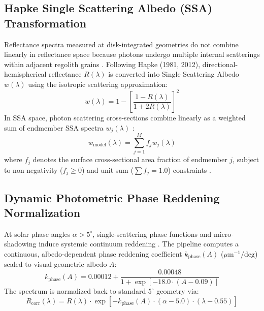 \documentclass[11pt,a4paper]{article}
\begin{document}
\subsection{Hapke Single Scattering Albedo (SSA) Transformation}
Reflectance spectra measured at disk-integrated geometries do not combine linearly in reflectance space because photons undergo multiple internal scatterings within adjacent regolith grains \cite{Hapke1981}. Following Hapke (1981, 2012), directional-hemispherical reflectance $R(\lambda)$ is converted into Single Scattering Albedo $w(\lambda)$ using the isotropic scattering approximation:
\begin{equation}
w(\lambda) = 1 - \left[ \frac{1 - R(\lambda)}{1 + 2R(\lambda)} \right]^2
\label{eq:hapke_ssa}
\end{equation}
In SSA space, photon scattering cross-sections combine linearly as a weighted sum of endmember SSA spectra $w_j(\lambda)$ \cite{Hapke1981, Hapke2012}:
\begin{equation}
w_{\text{model}}(\lambda) = \sum_{j=1}^{M} f_j w_j(\lambda)
\label{eq:ssa_linear}
\end{equation}
where $f_j$ denotes the surface cross-sectional area fraction of endmember $j$, subject to non-negativity ($f_j \ge 0$) and unit sum ($\sum f_j = 1.0$) constraints \cite{Lawson1995}.

\subsection{Dynamic Photometric Phase Reddening Normalization}
At solar phase angles $\alpha > 5^\circ$, single-scattering phase functions and micro-shadowing induce systemic continuum reddening \cite{Sanchez2012, Fornasier2015}. The pipeline computes a continuous, albedo-dependent phase reddening coefficient $k_{\text{phase}}(A)$ ($\mu\text{m}^{-1}/\text{deg}$) scaled to visual geometric albedo $A$:
\begin{equation}
k_{\text{phase}}(A) = 0.00012 + \frac{0.00048}{1 + \exp\left[-18.0 \cdot (A - 0.09)\right]}
\label{eq:phase_reddening}
\end{equation}
The spectrum is normalized back to standard $5^\circ$ geometry via:
\begin{equation}
R_{\text{corr}}(\lambda) = R(\lambda) \cdot \exp\left[ -k_{\text{phase}}(A) \cdot (\alpha - 5.0) \cdot (\lambda - 0.55) \right]
\label{eq:phase_correction}
\end{equation}
\end{document}
